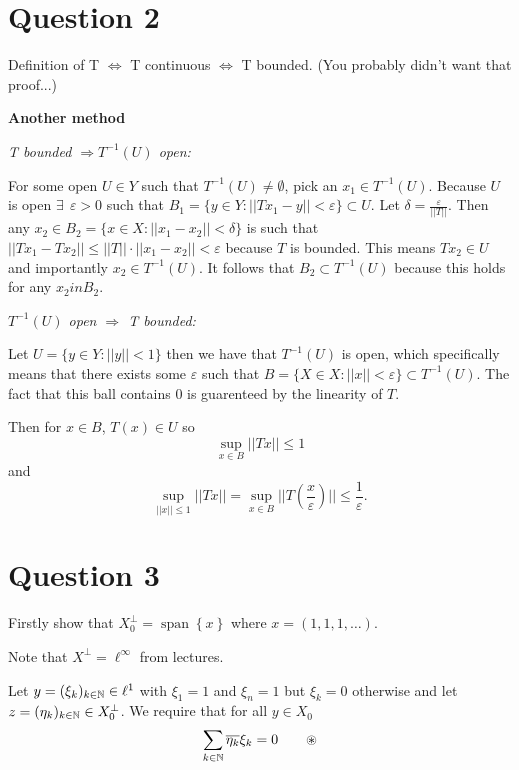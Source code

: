 \documentclass{unswmaths}
\begin{document}
\section*{Question 2}

Definition of T $ \Leftrightarrow $ T continuous $ \Leftrightarrow $ T bounded. (You probably didn't want that proof...)

\textbf{Another method}

\emph{T bounded $ \Rightarrow T^{-1}(U) $ open:}

For some open $ U \in Y $ such that $ T^{-1}(U) \neq \emptyset $, pick an $ x_1 \in T^{-1}(U) $.
Because $ U $ is open $ \exists \ \ \varepsilon > 0 $ such that $ B_1 =  \{ y \in Y : ||Tx_1-y|| < \varepsilon \} \subset U $. 
Let $ \delta = \frac{\varepsilon}{||T||} $. Then any $ x_2 \in B_2 = \{ x \in X : ||x_1 - x_2|| < \delta \} $
is such that $ ||Tx_1 - Tx_2|| \leq ||T|| \cdot ||x_1 - x_2 || < \varepsilon $ because $ T $ is bounded. This means $ Tx_2 \in U $ and importantly $ x_2 \in T^{-1}(U) $.
It follows that $ B_2 \subset T^{-1}(U) $ because this holds for any $ x_2 in B_2 $. 


\emph{$ T^{-1}(U) $ open $ \Rightarrow $ T bounded: }

Let $ U = \{ y \in Y : ||y|| < 1 \} $ then we have that $ T^{-1}(U) $ is open, which specifically means that there exists
some $ \varepsilon $ such that $ B = \{ X \in X : ||x|| < \varepsilon \} \subset T^{-1}(U) $. The fact that this ball contains $ 0 $ is guarenteed by the linearity of $ T $.

Then for $ x \in B $, $ T(x) \in U $ so $$ \sup_{x\in B} ||Tx|| \leq 1 $$ and $$ \sup_{||x|| \leq 1} ||T x|| =\sup_{x \in B} ||T(\frac{x}{\varepsilon})||  \leq \frac{1}{\varepsilon}. $$

\section*{Question 3}

Firstly show that $ X_0^\perp = \operatorname{span}\left\{ x \right\} $ where $ x = (1,1,1, \ldots ) $.

Note that $ X^\perp = \ell^\infty $ from lectures. 

Let $ y = (\xi_k)_{k\in\mathbb{N}} \in \ell^1 $ with $ \xi_1 = 1 $ and $ \xi_n = 1 $ but $ \xi_k = 0 $ otherwise and let $ z = ( \eta_k )_{k \in \mathbb{N}} \in X_0^\perp $. We require that for all $ y \in X_0 $
$$
	\sum_{k \in \mathbb{N}} \overline{\eta_k} \xi_k = 0 \ \ \ \ \ \ \circledast
$$
\end{document}
